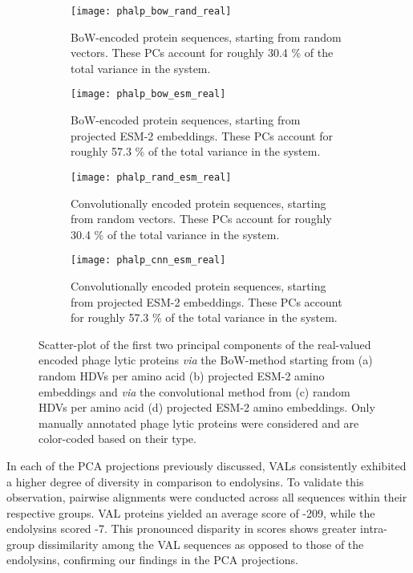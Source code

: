 \begin{figure}[h!]
    \centering
    \begin{subfigure}[b]{0.48\textwidth}
        \texttt{[image: phalp\_bow\_rand\_real]}
        \caption{BoW-encoded protein sequences, starting from random vectors. These PCs account for roughly 30.4 \% of the total variance in the system.}
    \label{fig:phalpbowrandr}
    \end{subfigure}
        \hfill
    \begin{subfigure}[b]{0.48\textwidth}
        \texttt{[image: phalp\_bow\_esm\_real]}
        \caption{BoW-encoded protein sequences, starting from projected ESM-2 embeddings. These PCs account for roughly 57.3 \% of the total variance in the system.}
    \label{fig:phalpbowesmr}
    \end{subfigure}
    \begin{subfigure}[b]{0.48\textwidth}
        \texttt{[image: phalp\_rand\_esm\_real]}
        \caption{Convolutionally encoded protein sequences, starting from random vectors. These PCs account for roughly 30.4 \% of the total variance in the system.}
    \label{fig:phalpcnnrandr}
    \end{subfigure}
    \hfill
    \begin{subfigure}[b]{0.48\textwidth}
        \texttt{[image: phalp\_cnn\_esm\_real]}
        \caption{Convolutionally encoded protein sequences, starting from projected ESM-2 embeddings. These PCs account for roughly 57.3 \% of the total variance in the system.}
    \label{fig:phalpcnnesmr}
    \end{subfigure}
    \caption{Scatter-plot of the first two principal components of the real-valued encoded phage lytic proteins \textit{via} the BoW-method starting from (a) random HDVs per amino acid (b) projected ESM-2 amino embeddings and \textit{via} the convolutional method from (c) random HDVs per amino acid (d) projected ESM-2 amino embeddings. Only manually annotated phage lytic proteins were considered and are color-coded based on their type.}\label{fig:phalp_embr}
\end{figure}

In each of the PCA projections previously discussed, VALs consistently exhibited a higher degree of diversity in comparison to endolysins. To validate this observation, pairwise alignments were conducted across all sequences within their respective groups. VAL proteins yielded an average score of -209, while the endolysins scored -7. This pronounced disparity in scores shows greater intra-group dissimilarity among the VAL sequences as opposed to those of the endolysins, confirming our findings in the PCA projections.

